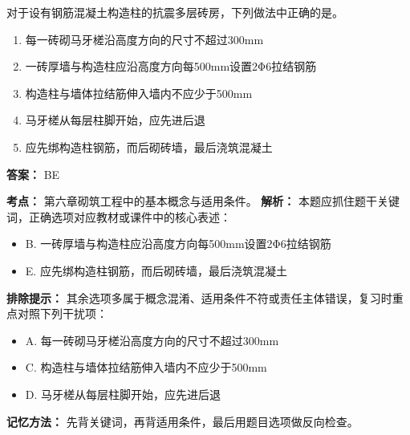 \documentclass[UTF8,fontset=fandol,11pt]{ctexart}
\begin{document}
\begin{quizbox}[title={第 22 题}]
对于设有钢筋混凝土构造柱的抗震多层砖房，下列做法中正确的是。\\
\begin{enumerate}[label=\Alph*.]
\item 每一砖砌马牙槎沿高度方向的尺寸不超过300mm
\item 一砖厚墙与构造柱应沿高度方向每500mm设置2Φ6拉结钢筋
\item 构造柱与墙体拉结筋伸入墙内不应少于500mm
\item 马牙槎从每层柱脚开始，应先进后退
\item 应先绑构造柱钢筋，而后砌砖墙，最后浇筑混凝土
\end{enumerate}
\textbf{答案：} BE
\vspace{0.25em}
\begin{answerbox}[title={考点解析}]
\textbf{考点：} 第六章砌筑工程中的基本概念与适用条件。
\textbf{解析：} 本题应抓住题干关键词，正确选项对应教材或课件中的核心表述：
\begin{itemize}
\item B. 一砖厚墙与构造柱应沿高度方向每500mm设置2Φ6拉结钢筋
\item E. 应先绑构造柱钢筋，而后砌砖墙，最后浇筑混凝土
\end{itemize}
\textbf{排除提示：} 其余选项多属于概念混淆、适用条件不符或责任主体错误，复习时重点对照下列干扰项：
\begin{itemize}
\item A. 每一砖砌马牙槎沿高度方向的尺寸不超过300mm
\item C. 构造柱与墙体拉结筋伸入墙内不应少于500mm
\item D. 马牙槎从每层柱脚开始，应先进后退
\end{itemize}
\textbf{记忆方法：} 先背关键词，再背适用条件，最后用题目选项做反向检查。
\end{answerbox}
\end{quizbox}

\vspace{0.2em}
\end{document}
